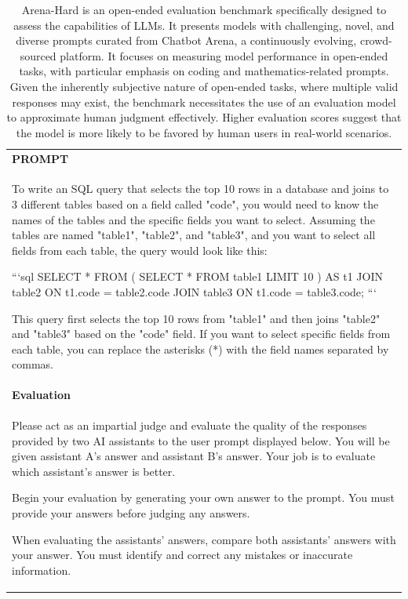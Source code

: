 \begin{table}[h]
    \centering \small
        \caption{Arena-Hard is an open-ended evaluation benchmark specifically designed to assess the capabilities of LLMs. It presents models with challenging, novel, and diverse prompts curated from Chatbot Arena, a continuously evolving, crowd-sourced platform. It focuses on measuring model performance in open-ended tasks, with particular emphasis on coding and mathematics-related prompts.
        Given the inherently subjective nature of open-ended tasks, where multiple valid responses may exist, the benchmark necessitates the use of an evaluation model to approximate human judgment effectively. Higher evaluation scores suggest that the model is more likely to be favored by human users in real-world scenarios.   }
    \label{tab:arenahard_eval_format_example}
    \begin{tabular}{p{}}
    \hline
    \textbf{PROMPT}\\
    To write an SQL query that selects the top 10 rows in a database and joins to 3 different tables based on a field called "code", you would need to know the names of the tables and the specific fields you want to select. Assuming the tables are named "table1", "table2", and "table3", and you want to select all fields from each table, the query would look like this:

```sql
SELECT *
FROM (
  SELECT * 
  FROM table1
  LIMIT 10
) AS t1
JOIN table2 ON t1.code = table2.code
JOIN table3 ON t1.code = table3.code;
```

This query first selects the top 10 rows from "table1" and then joins "table2" and "table3" based on the "code" field. If you want to select specific fields from each table, you can replace the asterisks (*) with the field names separated by commas.\\ \hline
      \textbf{Evaluation}\\
      Please act as an impartial judge and evaluate the quality of the responses provided by two AI assistants to the user prompt displayed below. You will be given assistant A's answer and assistant B's answer. Your job is to evaluate which assistant's answer is better.

Begin your evaluation by generating your own answer to the prompt. You must provide your answers before judging any answers.

When evaluating the assistants' answers, compare both assistants' answers with your answer. You must identify and correct any mistakes or inaccurate information.


\end{tabular}
\end{table}
